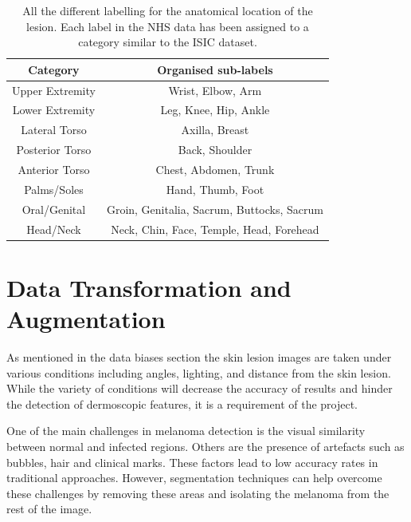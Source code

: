 \begin{table}
    \centering
    \begin{tabular}{|c|c|}
        Category & Organised sub-labels
        \\
        \hline
        Upper Extremity & Wrist, Elbow, Arm
        \\
        \hline
        Lower Extremity & Leg, Knee, Hip, Ankle
        \\
        \hline
        Lateral Torso & Axilla, Breast
        \\
        \hline
        Posterior Torso & Back, Shoulder
        \\
        \hline
        Anterior Torso & Chest, Abdomen, Trunk
        \\
        \hline
        Palms/Soles & Hand, Thumb, Foot
        \\
        \hline
        Oral/Genital & Groin, Genitalia, Sacrum, Buttocks, Sacrum
        \\
        \hline
        Head/Neck & Neck, Chin, Face, Temple, Head, Forehead
        \\
        \hline
    \end{tabular}
    \caption{All the different labelling for the anatomical location of the lesion. Each label in the NHS data has been assigned to a category similar to the ISIC dataset.}
\end{table}\label{nhs-location-names}


\section{Data Transformation and Augmentation}
As mentioned in the data biases section the skin lesion images are taken under various conditions including angles, lighting, and distance from the skin lesion. While the variety of conditions will decrease the accuracy of results and hinder the detection of dermoscopic features, it is a requirement of the project.

One of the main challenges in melanoma detection is the visual similarity between normal and infected regions. Others are the presence of artefacts such as bubbles, hair and clinical marks\cite{Albahli2020}. These factors lead to low accuracy rates in traditional approaches. However, segmentation techniques can help overcome these challenges by removing these areas and isolating the melanoma from the rest of the image.


